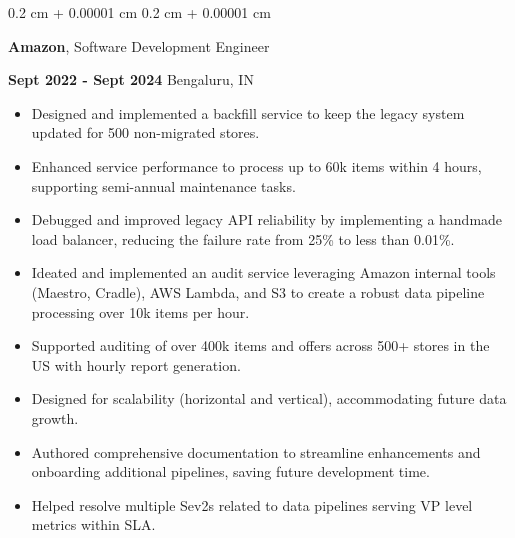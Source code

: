 \documentclass[10pt, letterpaper]{article}
\newenvironment{highlights}{
    \begin{itemize}[
        topsep=0.10 cm,
        parsep=0.10 cm,
        partopsep=0pt,
        itemsep=0pt,
        leftmargin=0.4 cm + 10pt
    ]
}{
    \end{itemize}
} %
\newenvironment{onecolentry}{
    \begin{adjustwidth}{
        0.2 cm + 0.00001 cm
    }{
        0.2 cm + 0.00001 cm
    }
}{
    \end{adjustwidth}
} %
\begin{document}
        \begin{onecolentry}
            {
        }
            \textbf{Amazon}, Software Development Engineer

            
            \textbf{Sept 2022 - Sept 2024} Bengaluru, IN  
            \begin{highlights}
                \item Designed and implemented a backfill service to keep the legacy system updated for 500 non-migrated stores.
                \item Enhanced service performance to process up to 60k items within 4 hours, supporting semi-annual maintenance tasks.
                \item Debugged and improved legacy API reliability by implementing a handmade load balancer, reducing the failure rate from 25\% to less than 0.01\%.
                \item Ideated and implemented an audit service leveraging Amazon internal tools (Maestro, Cradle), AWS Lambda, and S3 to create a robust data pipeline processing over 10k items per hour.
                \item  Supported auditing of over 400k items and offers across 500+ stores in the US with hourly report generation.
                \item  Designed for scalability (horizontal and vertical), accommodating future data growth.
                \item Authored comprehensive documentation to streamline enhancements and onboarding additional pipelines, saving future development time.
                \item Helped resolve multiple Sev2s related to data pipelines serving VP level metrics within SLA.
            \end{highlights}
        \end{onecolentry}


        \vspace{0.2 cm}
\end{document}

